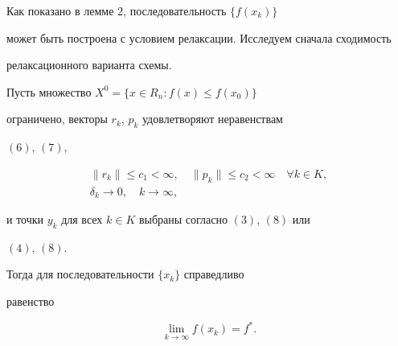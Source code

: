 Как показано в лемме 2, последовательность $\{{f(x_k)} \}$


может быть построена с условием релаксации. Исследуем сначала сходимость


релаксационного варианта схемы.





\begin{thm}


Пусть множество $X^{0}= \{{x\in R_n:f(x)\le f(x_0)} \}$


ограничено, векторы $r_k$, $p_k$ удовлетворяют неравенствам


$(6)$, $(7)$,


\begin{gather}


\|{r_k} \|\le c_1<\infty,\quad \|{p_k} \|\le c_2<\infty


\quad \forall k\in K, \\


%


\delta_k \to 0,\quad k \to \infty,


\end{gather}


и точки $y_k$ для всех $k\in K$ выбраны согласно $(3)$, $(8)$ или


$(4)$, $(8)$.


Тогда для последовательности $ \{{x_k} \}$ справедливо


равенство


\begin{equation}


\lim_{k \to \infty}f(x_k)=f^*.


\end{equation}


\end{thm}





